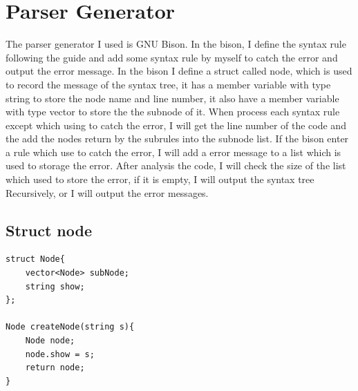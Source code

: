 \documentclass{article}
\begin{document}
    \section{Parser Generator}
        The parser generator I used is GNU Bison. In the bison, I define the syntax rule following the guide and add some syntax rule
        by myself to catch the error and output the error message. In the bison I define a struct called node, which is used to record the
        message of the syntax tree, it has a member variable with type string to store the node name and line number, it also have a member
        variable with type vector to store the the subnode of it. When process each syntax rule except which using to catch the error, 
        I will get the line number of the code and the add the nodes return by the subrules into the subnode list. If the bison enter a rule which
        use to catch the error, I will add a error message to a list which is used to storage the error. After analysis the code, I will check the size of the
        list which used to store the error, if it is empty, I will output the syntax tree Recursively, or I will output the error messages.
        \subsection{Struct node}
            \begin{lstlisting}
struct Node{
    vector<Node> subNode;
    string show;
};

Node createNode(string s){
    Node node;
    node.show = s;
    return node;
}                       
            \end{lstlisting}
\end{document}
